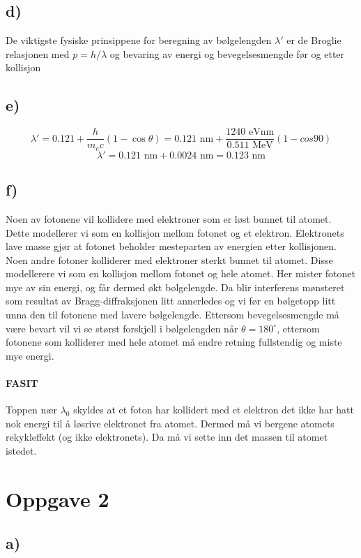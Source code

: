 \documentclass{article}
\begin{document}
\subsection*{d)}
De viktigste fysiske prinsippene for beregning av bølgelengden $λ'$ er de Broglie relasjonen med $p = h /λ$ og bevaring av energi og bevegelsesmengde før og etter kollisjon

\subsection*{e)}
\[
λ' = 0.121 + \frac{h}{m_ec}(1 - \cos θ) = 0.121 \text{ nm} + \frac{1240  \text{ eVnm}}{0.511 \text{ MeV}}(1 - cos 90) 
\]
\[
λ' = 0.121 \text{ nm} + 0.0024 \text{ nm} = 0.123 \text{ nm}
\]

\subsection*{f)}
Noen av fotonene vil kollidere med elektroner som er løst bunnet til atomet. Dette modellerer vi som en kollisjon mellom fotonet og et elektron. Elektronets lave masse gjør at fotonet beholder mesteparten av energien etter kollisjonen. Noen andre fotoner kolliderer med elektroner sterkt bunnet til atomet. Disse modellerere vi som en kollisjon mellom fotonet og hele atomet. Her mister fotonet mye av sin energi, og får dermed økt bølgelengde. Da blir interferens mønsteret som resultat av Bragg-diffraksjonen litt annerledes og vi før en bølgetopp litt unna den til fotonene med lavere bølgelengde. Ettersom bevegelsesmengde må være bevart vil vi se størst forskjell i bølgelengden når $θ = 180^∘$, ettersom fotonene som kolliderer med hele atomet må endre retning fullstendig og miste mye energi.

\paragraph*{FASIT}
Toppen nær $λ_0$ skyldes at et foton har kollidert med et elektron det ikke har hatt nok energi til å løsrive elektronet fra atomet. Dermed må vi bergene atomets rekykleffekt (og ikke elektronets). Da må vi sette inn det massen til atomet istedet. 


\section*{Oppgave 2}
\subsection*{a)}
\end{document}
